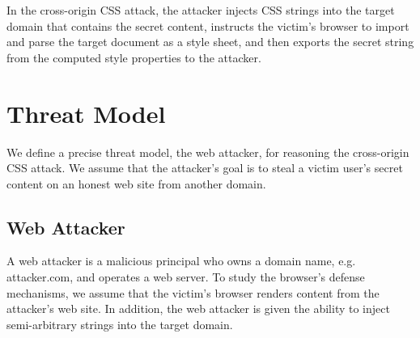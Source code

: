 \documentclass{acm_proc_article-sp}
\begin{document}
In the cross-origin CSS attack, the attacker injects CSS strings into the target domain that contains the secret content, instructs the victim's browser to import and parse the target document as a style sheet, and then exports the secret string from the computed style properties to the attacker.

\section{Threat Model}
We define a precise threat model, the web attacker, for reasoning the cross-origin CSS attack. We assume that the attacker's goal is to steal a victim user's secret content on an honest web site from another domain.

\subsection{Web Attacker}
A web attacker is a malicious principal who owns a domain name, e.g. attacker.com, and operates a web server. To study the browser's defense mechanisms, we assume that the victim's browser renders content from the attacker's web site. In addition, the web attacker is given the ability to inject semi-arbitrary strings into the target domain.
\end{document}
